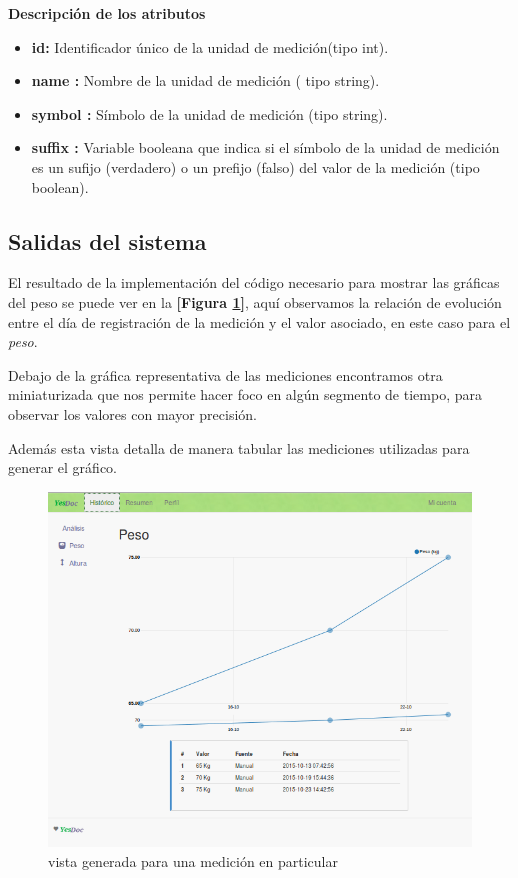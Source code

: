 \textbf{Descripción de los atributos}
\begin{itemize}
	\item \textbf{id:	}	Identificador único de la unidad de medición(tipo int).
	\item \textbf{name :	}	Nombre de la unidad de medición ( tipo string).
	\item \textbf{symbol :}		Símbolo de la unidad de medición (tipo string).
	\item \textbf{suffix :}	Variable booleana que indica si el símbolo de la unidad de medición es un sufijo (verdadero) o un prefijo (falso) del valor de la medición (tipo boolean).
\end{itemize}



\subsection{Salidas del sistema}

El resultado de la implementación del código necesario para mostrar las gráficas del peso se puede ver en la \textbf{[Figura \ref{5-grafica_medicion}]}, aquí observamos la relación de evolución entre el día de registración de la medición y el valor asociado, en este caso para el \textit{peso}.

Debajo de la gráfica representativa de las mediciones encontramos otra miniaturizada que nos permite hacer foco en algún segmento de tiempo, para observar los valores con mayor precisión.

Además esta vista detalla de manera tabular las mediciones utilizadas para generar el gráfico.


\begin{figure}[h!]
  \centering
  \includegraphics[width=.8\textwidth]{img/5-grafica_medicion}
  \caption{vista generada para una medición en particular}
  \label{5-grafica_medicion}
\end{figure}


